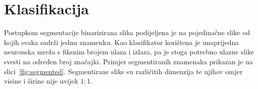 \section{Klasifikacija}
\label{sec:klasifikacija}
Postupkom segmentacije binarizirana slika podijeljena je na pojedinačne slike od kojih svaka sadrži jednu znamenku. Kao
klasifikator korištena je unaprijedna neuronska mreža s fiksnim brojem ulaza i izlaza, pa je stoga potrebno ulazne slike
svesti na određen broj značajki. Primjer segmentiranih znamenaka prikazan je na slici\ \ref{fig:segmented}. Segmentirane
slike su različitih dimenzija te njihov omjer visine i širine nije uvijek $1:1$.
\begin{figure}[htb]
    \centering

\end{figure}

